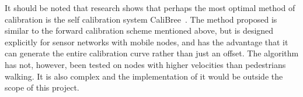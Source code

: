 It should be noted that research shows that perhaps the most optimal method of calibration is the self calibration system CaliBree~\cite{calibree}. The method proposed is similar to the forward calibration scheme mentioned above, but is designed explicitly for sensor networks with mobile nodes, and has the advantage that it can generate the entire calibration curve rather than just an offset. The algorithm has not, however, been tested on nodes with higher velocities than pedestrians walking. It is also complex and the implementation of it would be outside the scope of this project. 
